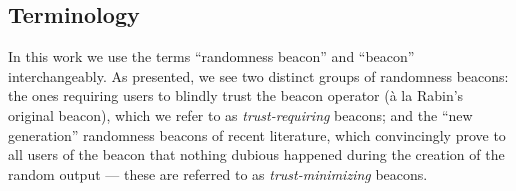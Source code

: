 \subsection{Terminology}
In this work we use the terms \enquote{randomness beacon} and \enquote{beacon} interchangeably.
As presented, we see two distinct groups of randomness beacons: the ones requiring users to blindly trust the beacon operator (à la Rabin's original beacon), which we refer to as \emph{trust-requiring} beacons; and the \enquote{new generation} randomness beacons of recent literature, which convincingly prove to all users of the beacon that nothing dubious happened during the creation of the random output --- these are referred to as \emph{trust-minimizing} beacons.


